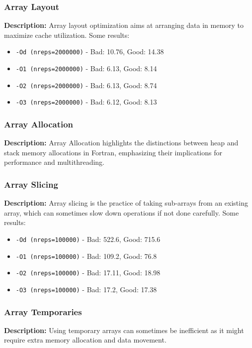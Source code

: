 \subsubsection{Array Layout}
\textbf{Description:} Array layout optimization aims at arranging data in memory to maximize cache utilization. Some results: 
\begin{itemize}[itemsep=0.3ex]
    \item \texttt{-Od (nreps=2000000)} - Bad: 10.76, Good: 14.38
    \item \texttt{-O1 (nreps=2000000)} - Bad: 6.13, Good: 8.14
    \item \texttt{-O2 (nreps=2000000)} - Bad: 6.13, Good: 8.74
    \item \texttt{-O3 (nreps=2000000)} - Bad: 6.12, Good: 8.13
\end{itemize}

\subsubsection{Array Allocation}
\textbf{Description:} Array Allocation highlights the distinctions between heap and stack memory allocations in Fortran, emphasizing their implications for performance and multithreading.


\subsubsection{Array Slicing}
\textbf{Description:} Array slicing is the practice of taking sub-arrays from an existing array, which can sometimes slow down operations if not done carefully. Some results:
\begin{itemize}[itemsep=0.3ex]
    \item \texttt{-Od (nreps=100000)} - Bad: 522.6, Good: 715.6
    \item \texttt{-O1 (nreps=100000)} - Bad: 109.2, Good: 76.8
    \item \texttt{-O2 (nreps=100000)} - Bad: 17.11, Good: 18.98
    \item \texttt{-O3 (nreps=100000)} - Bad: 17.2, Good: 17.38
\end{itemize}

\subsubsection{Array Temporaries}
\textbf{Description:} Using temporary arrays can sometimes be inefficient as it might require extra memory allocation and data movement.

